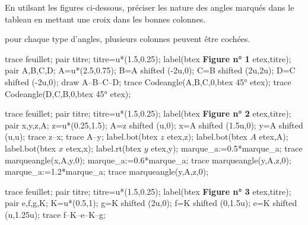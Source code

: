 \begin{corrige}
    En utilsant les figures ci-dessous, préciser les nature des angles marqués dans le tableau en mettant une croix dans les bonnes colonnes.\par
    \begin{changemargin}{-10mm}{-20mm}
        \begin{remarque}
            pour chaque type d'angles, plusieurs colonnes peuvent être cochées.
        \end{remarque}
    \end{changemargin}    
    \begin{changemargin}{0mm}{-20mm}
        \hspace*{-18mm}
        \begin{Geometrie}[CoinHD={(3u,3u)}]
            trace feuillet;
            pair titre;
            titre=u*(1.5,0.25);
            label(btex {\bfseries Figure n° 1 } etex,titre);
            pair A,B,C,D;
            A=u*(2.5,0.75);
            B=A shifted (-2u,0);
            C=B shifted (2u,2u);
            D=C shifted (-2u,0);
            draw A--B--C--D;
            trace Codeangle(A,B,C,0,btex \ang{45} etex); 
            trace Codeangle(D,C,B,0,btex \ang{45} etex);
        \end{Geometrie}
        \begin{Geometrie}[CoinHD={(3u,3u)}]
            trace feuillet;
            pair titre;
            titre=u*(1.5,0.25);
            label(btex {\bfseries Figure n° 2 } etex,titre);
            pair x,y,z,A;
            z=u*(0.25,1.5);
            A=z shifted (u,0);
            x=A shifted (1.5u,0);
            y=A shifted (u,u);
            trace z--x;
            trace A--y;
            label.bot(btex $z$ etex,z);
            label.bot(btex $A$ etex,A);
            label.bot(btex $x$ etex,x);
            label.rt(btex $y$ etex,y);
            marque_a:=0.5*marque_a;
            trace marqueangle(x,A,y,0);
            marque_a:=0.6*marque_a;
            trace marqueangle(y,A,z,0);
            marque_a:=1.2*marque_a;
            trace marqueangle(y,A,z,0);
        \end{Geometrie}
        \begin{Geometrie}[CoinHD={(3u,3u)}]
            trace feuillet;
            pair titre;
            titre=u*(1.5,0.25);
            label(btex {\bfseries Figure n° 3 } etex,titre);
            pair e,f,g,K;
            K=u*(0.5,1);
            g=K shifted (2u,0);
            f=K shifted (0,1.5u);
            e=K shifted (u,1.25u);
            trace f--K--e--K--g;

\end{Geometrie}
\end{changemargin}
\end{corrige}
